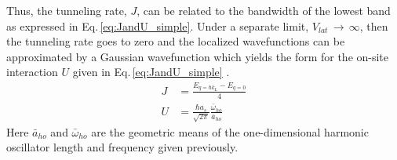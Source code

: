 Thus, the tunneling rate, $J$, can be related to the bandwidth of the lowest band as expressed in Eq.\,\ref{eq:JandU_simple}.
Under a separate limit, $V_{lat}\,\rightarrow\,\infty$, then the tunneling rate goes to zero and the localized wavefunctions can be approximated by a Gaussian wavefunction which yields the form for the on-site interaction $U$ given in Eq.\,\ref{eq:JandU_simple} \hl{\cite{Rey2004}}.
	\begin{equation} \label{eq:JandU_simple}
	\begin{aligned}
		 J &= \frac{E_{q=\hbar k_L} - E_{q=0}}{4}\\
		 U &= \frac{\hbar a_s}{\sqrt{2 \pi}}\frac{\bar{\omega}_{ho}}{\bar{a}_{ho}}
	\end{aligned}
	\end{equation}
Here $\bar{a}_{ho}$ and $\bar{\omega}_{ho}$ are the geometric means of the one-dimensional harmonic oscillator length and frequency given previously.


